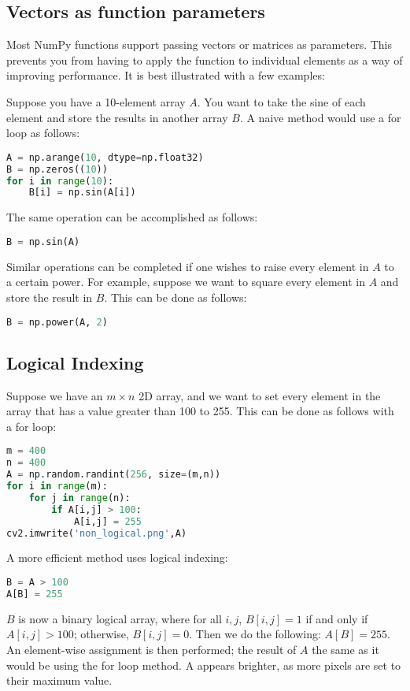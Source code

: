 \documentclass[11pt]{article}
\begin{document}
\subsection{Vectors as function parameters}
Most NumPy functions support passing vectors or matrices as parameters. This prevents you from having to apply the function to individual elements as a way of improving performance. It is best illustrated with a few examples:

Suppose you have a 10-element array $A$. You want to take the sine of each element and store the results in another array $B$. A naive method would use a for loop as follows:
\begin{lstlisting}[language=python]
A = np.arange(10, dtype=np.float32)
B = np.zeros((10))
for i in range(10):
    B[i] = np.sin(A[i])
\end{lstlisting}

The same operation can be accomplished as follows:
\begin{lstlisting}[language=python]
B = np.sin(A)
\end{lstlisting}
Similar operations can be completed if one wishes to raise every element in $A$ to a certain power. For example, suppose we want to square every element in $A$ and store the result in $B$. This can be done as follows:
\begin{lstlisting}[language=python]
B = np.power(A, 2)
\end{lstlisting}

\subsection{Logical Indexing}

Suppose we have an $m \times n$ 2D array, and we want to set every element in the array that has a value greater than 100 to 255. This can be done as follows with a for loop:
\begin{lstlisting}[language=python]
m = 400
n = 400
A = np.random.randint(256, size=(m,n))
for i in range(m):
    for j in range(n):
        if A[i,j] > 100:
            A[i,j] = 255
cv2.imwrite('non_logical.png',A)
\end{lstlisting}
A more efficient method uses logical indexing:
\begin{lstlisting}[language=python]
B = A > 100
A[B] = 255
\end{lstlisting}
$B$ is now a binary logical array, where for all $i,j$, $B[i,j]=1$ if and only if $A[i,j] > 100$; otherwise, $B[i,j]=0$. Then we do the following: $A[B] = 255$. An element-wise assignment is then performed; the result of $A$ the same as it would be using the for loop method. A appears brighter, as more pixels are set to their maximum value.
\end{document}
